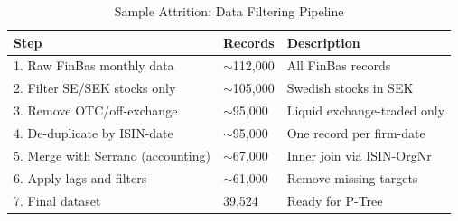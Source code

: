 \begin{table}[ht]
\centering
\caption{Sample Attrition: Data Filtering Pipeline} 
\label{tab:sample_attrition}
\begin{tabular}{lll}
  \hline
Step & Records & Description \\ 
  \hline
1. Raw FinBas monthly data & $\sim$112,000 & All FinBas records \\ 
  2. Filter SE/SEK stocks only & $\sim$105,000 & Swedish stocks in SEK \\ 
  3. Remove OTC/off-exchange & $\sim$95,000 & Liquid exchange-traded only \\ 
  4. De-duplicate by ISIN-date & $\sim$95,000 & One record per firm-date \\ 
  5. Merge with Serrano (accounting) & $\sim$67,000 & Inner join via ISIN-OrgNr \\ 
  6. Apply lags and filters & $\sim$61,000 & Remove missing targets \\ 
  7. Final dataset & 39,524 & Ready for P-Tree \\ 
   \hline
\end{tabular}
\end{table}
